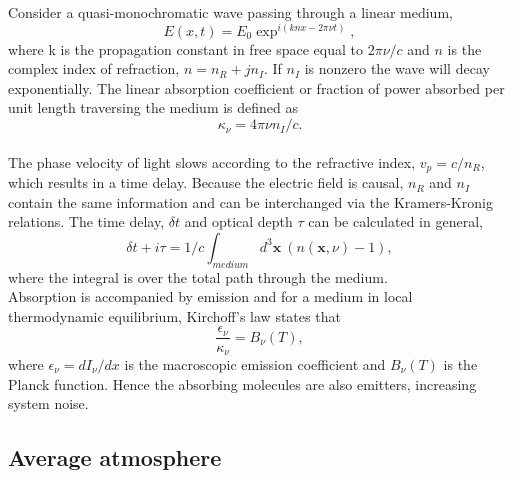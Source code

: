 Consider a quasi-monochromatic wave passing through a linear medium,
\begin{equation}
E(x,t) = E_0 \exp^{i(knx - 2\pi\nu t)},
\end{equation}		
where k is the propagation constant in free space equal to $2\pi \nu/c$ and $n$ is the complex index of refraction, $n= n_R + j n_I$. If $n_I$ is nonzero the wave will decay exponentially. The linear absorption coefficient or fraction of power absorbed per unit length traversing the medium is defined as 
\begin{equation}
\kappa_\nu = 4\pi \nu n_I/c.
\end{equation}
~\\
The phase velocity of light slows according to the refractive index, $v_p = c/n_R$, which results in a time delay.  Because the electric field is causal, $n_R$ and $n_I$ contain the same information and can be interchanged via the Kramers-Kronig relations. The time delay, $\delta t$ and optical depth $\tau$ can be calculated in general,
\begin{equation}\label{timedelay}
\delta t + i \tau =1/c \int_{medium} d^3\mathbf{x}\  (n(\mathbf{x}, \nu) -1),
\end{equation}
where the integral is over the total path through the medium.
~\\
Absorption is accompanied by emission and for a medium in local thermodynamic equilibrium, Kirchoff's law states that 
\begin{equation}\label{kirchoff}
\frac{\epsilon_\nu}{\kappa_\nu}=B_\nu(T),
\end{equation}
where $\epsilon_\nu = dI_\nu/dx$ is the macroscopic emission coefficient and $B_\nu(T)$ is the Planck function. Hence the absorbing molecules are also emitters, increasing system noise.\\


\subsection{Average atmosphere}

